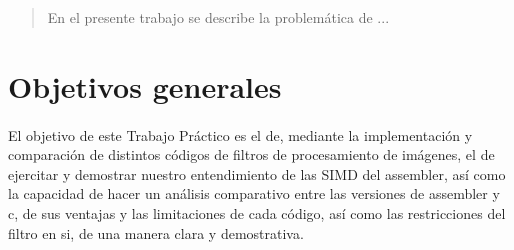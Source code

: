 \documentclass[a4paper]{article}
\newenvironment{codesnippet}{%
	\begin{Sbox}\begin{minipage}{\textwidth}\sffamily\small}%
	{\end{minipage}\end{Sbox}%
		\begin{center}%
		\vspace{-0.4cm}\colorbox{litegrey}{\TheSbox}\end{center}\vspace{0.3cm}}
\begin{document}
\thispagestyle{empty}

\newpage

\thispagestyle{empty}
\vfill
\begin{abstract}
En el presente trabajo se describe la problemática de ...
\end{abstract}

\thispagestyle{empty}
\vspace{3cm}
\tableofcontents
\newpage


\newpage

\section{Objetivos generales}
\paragraph{}
El objetivo de este Trabajo Práctico es el de, mediante la implementación y comparación de distintos códigos de filtros de procesamiento de imágenes,  el de   ejercitar y demostrar nuestro entendimiento de las SIMD del assembler, así como la capacidad de hacer un análisis comparativo entre las versiones de assembler y c, de sus ventajas y las limitaciones de cada  código, así como las restricciones del filtro en si, de una manera clara y demostrativa. 
        
        
\end{document}
